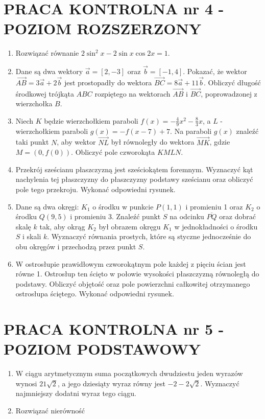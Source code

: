 \documentclass[10pt]{article}
\begin{document}
\section*{PRACA KONTROLNA nr 4 - POZIOM ROZSZERZONY}
\begin{enumerate}
  \item Rozwiązać równanie $2 \sin ^{2} x-2 \sin x \cos 2 x=1$.
  \item Dane są dwa wektory $\vec{a}=[2,-3]$ oraz $\vec{b}=[-1,4]$. Pokazać, że wektor $\overrightarrow{A B}=3 \vec{a}+2 \vec{b}$ jest prostopadły do wektora $\overrightarrow{B C}=8 \vec{a}+11 \vec{b}$. Obliczyć długość środkowej trójkąta $A B C$ rozpiętego na wektorach $\overrightarrow{A B}$ i $\overrightarrow{B C}$, poprowadzonej z wierzchołka $B$.
  \item Niech $K$ będzie wierzchołkiem paraboli $f(x)=-\frac{4}{9} x^{2}-\frac{8}{3} x$, a $L$ - wierzchołkiem paraboli $g(x)=-f(x-7)+7$. Na paraboli $g(x)$ znaleźć taki punkt $N$, aby wektor $\overrightarrow{N L}$ był równoległy do wektora $\overrightarrow{M K}$, gdzie $M=(0, f(0))$. Obliczyć pole czworokąta $K M L N$.
  \item Przekrój sześcianu płaszczyzną jest sześciokątem foremnym. Wyznaczyć kąt nachylenia tej płaszczyzny do płaszczyzny podstawy sześcianu oraz obliczyć pole tego przekroju. Wykonać odpowiedni rysunek.
  \item Dane są dwa okręgi: $K_{1}$ o środku w punkcie $P(1,1)$ i promieniu 1 oraz $K_{2}$ o środku $Q(9,5)$ i promieniu 3. Znaleźć punkt $S$ na odcinku $\overline{P Q}$ oraz dobrać skalę $k$ tak, aby okrąg $K_{2}$ był obrazem okręgu $K_{1}$ w jednokładności o środku $S$ i skali $k$. Wyznaczyć równania prostych, które są styczne jednocześnie do obu okręgów i przechodzą przez punkt $S$.
  \item W ostrosłupie prawidłowym czworokątnym pole każdej z pięciu ścian jest równe 1. Ostrosłup ten ścięto w połowie wysokości płaszczyzną równoległą do podstawy. Obliczyć objętość oraz pole powierzchni całkowitej otrzymanego ostrosłupa ściętego. Wykonać odpowiedni rysunek.
\end{enumerate}

\section*{PRACA KONTROLNA nr 5 - POZIOM PODSTAWOWY}
\begin{enumerate}
  \item W ciągu arytmetycznym suma początkowych dwudziestu jeden wyrazów wynosi $21 \sqrt{2}$, a jego dziesiąty wyraz równy jest $-2-2 \sqrt{2}$. Wyznaczyć najmniejszy dodatni wyraz tego ciągu.
  \item Rozwiązać nierówność
\end{enumerate}
\end{document}
